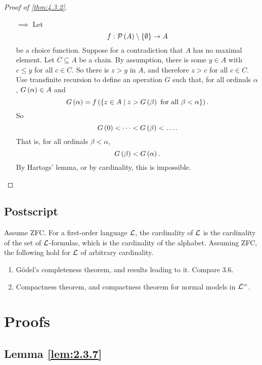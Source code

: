 \begin{proof}[Proof of \ref{thm:4.3.2}]
\hfill
\begin{itemize}
\item[$ \implies $] Let
$$ f : \mathcal{P} \left( A \right) \setminus \left\{ \emptyset \right\} \to A $$
be a choice function. Suppose for a contradiction that $ A $ has no maximal element. Let $ C \subseteq A $ be a chain. By assumption, there is some $ y \in A $ with $ c \le y $ for all $ c \in C $. So there is $ z > y $ in $ A $, and therefore $ z > c $ for all $ c \in C $. Use transfinite recursion to define an operation $ G $ such that, for all ordinals $ \alpha $, $ G\left( \alpha \right) \in A $ and
$$ G\left( \alpha \right) = f\left( \left\{ z \in A \mid z > G\left( \beta \right) \ \text{for all} \ \beta < \alpha \right\} \right). $$
So
$$ G\left( 0 \right) < \dots < G\left( \beta \right) < \dots. $$
That is, for all ordinals $ \beta < \alpha $,
$$ G\left( \beta \right) < G\left( \alpha \right). $$
By Hartogs' lemma, or by cardinality, this is impossible.
\end{itemize}
\end{proof}

\pagebreak

\subsection{Postscript}

Assume ZFC. For a first-order language $ \mathcal{L} $, the cardinality of $ \mathcal{L} $ is the cardinality of the set of $ \mathcal{L} $-formulas, which is the cardinality of the alphabet. Assuming ZFC, the following hold for $ \mathcal{L} $ of arbitrary cardinality.
\begin{enumerate}
\item G\"odel's completeness theorem, and results leading to it. Compare 3.6.
\item Compactness theorem, and compactness theorem for normal models in $ \mathcal{L}^= $.
\end{enumerate}

\pagebreak

\appendix

\section{Proofs}

\subsection{Lemma \ref{lem:2.3.7}}

